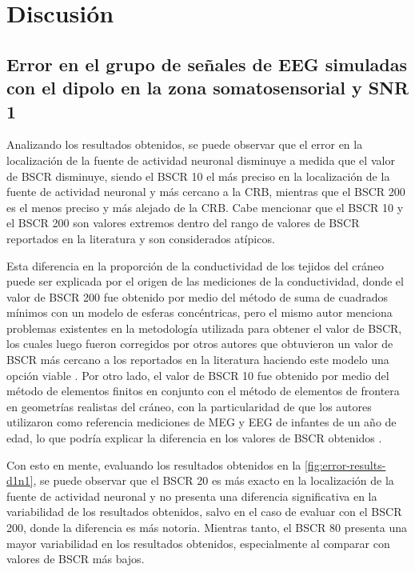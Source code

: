 %
\chapter{Discusión}
\label{sec:discusion}

\section{Error en el grupo de señales de EEG simuladas con
el dipolo en la zona somatosensorial y SNR 1 }

Analizando los resultados obtenidos, se puede observar que el error en la localización de la fuente de actividad neuronal disminuye a medida que el valor de BSCR disminuye, siendo el BSCR 10 el más preciso en la localización de la fuente de actividad neuronal y más cercano a la CRB, mientras que el BSCR 200 es el menos preciso y más alejado de la CRB.
Cabe mencionar que el BSCR 10 y el BSCR 200 son valores extremos dentro del rango de valores de BSCR reportados en la literatura y son considerados atípicos. 

Esta diferencia en la proporción de la conductividad de los tejidos del cráneo puede ser explicada por el origen de las mediciones de la conductividad, donde el valor de BSCR 200 fue obtenido por medio del método de suma de cuadrados mínimos con un modelo de esferas concéntricas, pero el mismo autor menciona problemas existentes en la metodología utilizada para obtener el valor de BSCR, los cuales luego fueron corregidos por otros autores que obtuvieron un valor de BSCR más cercano a los reportados en la literatura haciendo este modelo una opción viable \cite{eriksenVivoHumanHead1990, Gutierrez2004}. 
Por otro lado, el valor de BSCR 10 fue obtenido por medio del método de elementos finitos en conjunto con el método de elementos de frontera en geometrías realistas del cráneo, con la particularidad de que los autores utilizaron como referencia mediciones de MEG y EEG de infantes de un año de edad, lo que podría explicar la diferencia en los valores de BSCR obtenidos \cite{acarHighresolutionEEGSource2016}.

Con esto en mente, evaluando los resultados obtenidos en la \cref{fig:error-results-d1n1}, se puede observar que el BSCR 20 es más exacto en la localización de la fuente de actividad neuronal y no presenta una diferencia significativa en la variabilidad de los resultados obtenidos, salvo en el caso de evaluar con el BSCR 200, donde la diferencia es más notoria. 
Mientras tanto, el BSCR 80 presenta una mayor variabilidad en los resultados obtenidos, especialmente al comparar con valores de BSCR más bajos.  

